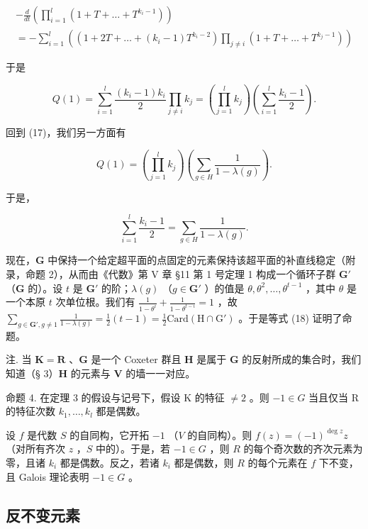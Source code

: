 \[
\begin{array}{l} - \frac {d}{d t} \left(\prod_ {i = 1} ^ {l} (1 + T + \dots + T ^ {k _ {i} - 1})\right) \\ = - \sum_ {i = 1} ^ {l} \left((1 + 2 T + \dots + (k _ {i} - 1) T ^ {k _ {i} - 2}) \prod_ {j \neq i} (1 + T + \dots + T ^ {k _ {j} - 1})\right) \end{array}
\]

于是

\[
Q (1) = \sum_ {i = 1} ^ {l} \frac {\left(k _ {i} - 1\right) k _ {i}}{2} \prod_ {j \neq i} k _ {j} = \left(\prod_ {j = 1} ^ {l} k _ {j}\right) \left(\sum_ {i = 1} ^ {l} \frac {k _ {i} - 1}{2}\right).
\]

回到 (17)，我们另一方面有

\[
Q (1) = \left(\prod_ {j = 1} ^ {l} k _ {j}\right) \left(\sum_ {g \in H} \frac {1}{1 - \lambda (g)}\right).
\]

于是，

\[
\sum_ {i = 1} ^ {l} \frac {k _ {i} - 1}{2} = \sum_ {g \in H} \frac {1}{1 - \lambda (g)}.\tag{18}
\]

现在，\(\mathbf{G}\) 中保持一个给定超平面的点固定的元素保持该超平面的补直线稳定（附录，命题 2），从而由《代数》第 V 章 §11 第 1 号定理 1 构成一个循环子群 \(\mathbf{G}'\) （\(\mathbf{G}\) 的）。设 \(t\) 是 \(\mathbf{G}'\) 的阶；\(\lambda(g)\) （\(g \in \mathbf{G}'\) ）的值是 \(\theta, \theta^2, \ldots, \theta^{t-1}\) ，其中 \(\theta\) 是一个本原 \(t\) 次单位根。我们有 \(\frac{1}{1-\theta^i} + \frac{1}{1-\theta^{t-i}} = 1\) ，故 \(\sum_{g \in \mathbf{G}', g \neq 1} \frac{1}{1-\lambda(g)} = \frac{1}{2}(t-1) = \frac{1}{2}\mathrm{Card}(\mathrm{H} \cap \mathrm{G}')\) 。于是等式 (18) 证明了命题。

注. 当 \(\mathbf{K} = \mathbf{R}\) 、\(\mathbf{G}\) 是一个 Coxeter 群且 \(\mathbf{H}\) 是属于 \(\mathbf{G}\) 的反射所成的集合时，我们知道（§ 3）\(\mathbf{H}\) 的元素与 \(\mathbf{V}\) 的墙一一对应。

命题 4. 在定理 3 的假设与记号下，假设 K 的特征 \(\neq 2\) 。则 \(-1 \in G\) 当且仅当 R 的特征次数 \(k_{1}, \ldots, k_{l}\) 都是偶数。

设 \(f\) 是代数 \(S\) 的自同构，它开拓 \(-1\) （\(V\) 的自同构）。则 \(f(z) = (-1)^{\deg z}z\) （对所有齐次 \(z\) ，\(S\) 中的）。于是，若 \(-1 \in G\) ，则 \(R\) 的每个奇次数的齐次元素为零，且诸 \(k_i\) 都是偶数。反之，若诸 \(k_i\) 都是偶数，则 \(R\) 的每个元素在 \(f\) 下不变，且 Galois 理论表明 \(-1 \in G\) 。

\subsection{反不变元素}

